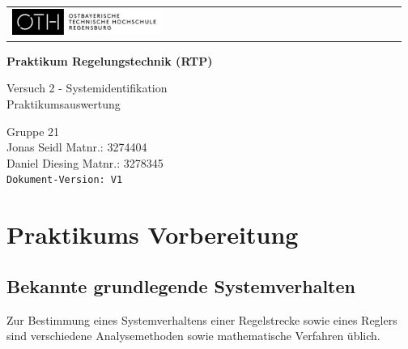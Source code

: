\documentclass[12pt, oneside, a4paper]{scrreprt}
\begin{document}
\begin{titlepage}
   \begin{tabular}{l r} 
      \includegraphics[width=0.4\textwidth]{Bilder/oth-regensburg-logo} 
      &
   \end{tabular}
   
   \begin{minipage} [c] [8.5cm] [b] {\textwidth}
      \Huge{
         \begin{center}
            \textbf{Praktikum Regelungstechnik (RTP)}\\[0.8cm]
            \par
            {\large Versuch 2 - Systemidentifikation }\\[1cm]
            {\large Praktikumsauswertung} \\[1cm]
         \end{center}
      }    
   \end{minipage}
   \vspace{0.1cm}
   \begin{minipage} [c] [3.5cm] [b] {\textwidth}
      \begin{center}
         \vspace{0.3cm}
         Gruppe 21\\
         Jonas Seidl Matnr.: 3274404 \\
         Daniel Diesing Matnr.: 3278345\\
         \vspace{0.5cm}
         \texttt{Dokument-Version: V1}\\
	   \end{center}
   \end{minipage}
\end{titlepage}

\newpage
\tableofcontents



\chapter{Praktikums Vorbereitung}
\label{Praktikumsvorbereitung}

\section{Bekannte grundlegende Systemverhalten}
Zur Bestimmung eines Systemverhaltens einer Regelstrecke sowie eines Reglers sind 
verschiedene Analysemethoden sowie mathematische Verfahren üblich.
\end{document}
